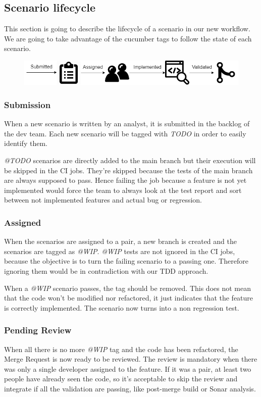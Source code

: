 \subsection{Scenario lifecycle}\label{subsec:scenario-lifecycle}
This section is going to describe the lifecycle of a scenario in our new
workflow.
We are going to take advantage of the cucumber tags to follow the state of
each scenario.

\begin{figure}
    \includegraphics[width=\textwidth]{../../resources/images/solution/scenario_lifecycle.png}
    \centering
\end{figure}

\subsubsection{Submission}
When a new scenario is written by an analyst, it is submitted in the backlog
of the dev team.
Each new scenario will be tagged with \textit{TODO} in order to easily identify
them.

\textit{@TODO} scenarios are directly added to the main branch but their
execution will be skipped in the CI jobs.
They're skipped because the tests of the main branch are always supposed to
pass.
Hence failing the job because a feature is not yet implemented would force the
team to always look at the test report and sort between not implemented
features and actual bug or regression.

\subsubsection{Assigned}
When the scenarios are assigned to a pair, a new branch is created and the
scenarios are tagged as \textit{@WIP}.
\textit{@WIP} tests are not ignored in the CI jobs, because the objective is
to turn the failing scenario to a passing one.
Therefore ignoring them would be in contradiction with our TDD approach.

When a \textit{@WIP }scenario passes, the tag should be removed.
This does not mean that the code won't be modified nor refactored, it
just indicates that the feature is correctly implemented.
The scenario now turns into a non regression test.

\subsubsection{Pending Review}
When all there is no more \textit{@WIP} tag and the code has been refactored,
the Merge Request is now ready to be reviewed.
The review is mandatory when there was only a single developer assigned to
the feature.
If it was a pair, at least two people have already seen the code, so it's
acceptable to skip the review and integrate if all the validation are
passing, like post-merge build or Sonar analysis.


